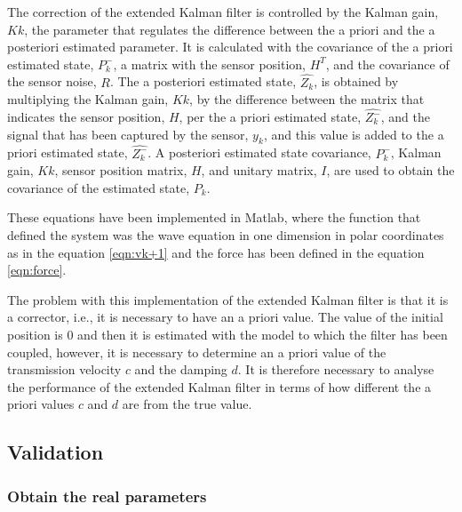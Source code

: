 \documentclass[12pt, a4paper]{article} %
\begin{document}
The correction of the extended Kalman filter is controlled by the Kalman gain, $Kk$, the parameter that regulates the difference between the a priori and the a posteriori estimated parameter. It is calculated with the covariance of the a priori estimated state,  $P_{k}^{-}$, a matrix with the sensor position, $H^{T}$, and the covariance of the sensor noise, $R$. The a posteriori estimated state, $\hat{Z_{k}}$, is obtained by multiplying the Kalman gain, $Kk$, by the difference between the matrix that indicates the sensor position, $H$, per the a priori estimated state, $\hat{Z_{k}^{-}}$, and the signal that has been captured by the sensor, $y_{k}$, and this value is added to the a priori estimated state,  $\hat{Z_{k}^{-}}$. A posteriori estimated state covariance, $P_{k}^{-}$, Kalman gain, $Kk$, sensor position matrix, $H$, and unitary matrix, $I$, are used to obtain the covariance of the estimated state, $P_{k}$.

These equations have been implemented in Matlab, where the function that defined the system was the wave equation in one dimension in polar coordinates as in the equation \ref{eqn:vk+1} and the force has been defined in the equation \ref{eqn:force}. 

The problem with this implementation of the extended Kalman filter is that it is a corrector, i.e., it is necessary to have an a priori value. The value of the initial position is 0 and then it is estimated with the model to which the filter has been coupled, however, it is necessary to determine an a priori value of the transmission velocity $c$ and the damping $d$. It is therefore necessary to analyse the performance of the extended Kalman filter in terms of how different the a priori values $c$ and $d$ are from the true value.

\setlength{\parskip}{0mm}

\subsection{Validation}

\subsubsection{Obtain the real parameters}
\end{document}
